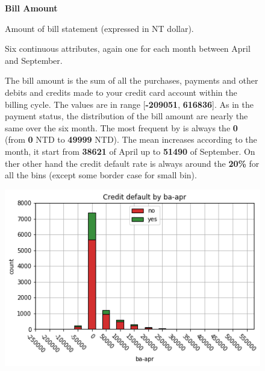 \smallskip
\begin{figure}[h]
  \begin{minipage}[h]{.50\textwidth}
        {\Large \textbf{Bill Amount}}
        
        Amount of bill statement (expressed in NT dollar).
        
        Six continuous attributes, again one for each month between April and September.
        
        The bill amount is the sum of all the purchases, payments and other debits and credits made to your credit card account within the billing cycle. The values are in range [\textbf{-209051}, \textbf{616836}].
        As in the payment status, the distribution of the bill amount are nearly the same over the six month. The most frequent by is always the \textbf{0} (from \textbf{0} NTD to \textbf{49999} NTD).
        The mean increases according to the month, it start from \textbf{38621} of April up to \textbf{51490} of September. On ther other hand the credit default rate is always around the \textbf{20\%} for all the bins (except some border case for small bin).
        
  \end{minipage}
  \begin{minipage}[h]{.50\textwidth}
    \includegraphics[width=.95\textwidth]{img/ch2/bill_amount_1}
  \end{minipage}
\end{figure}

